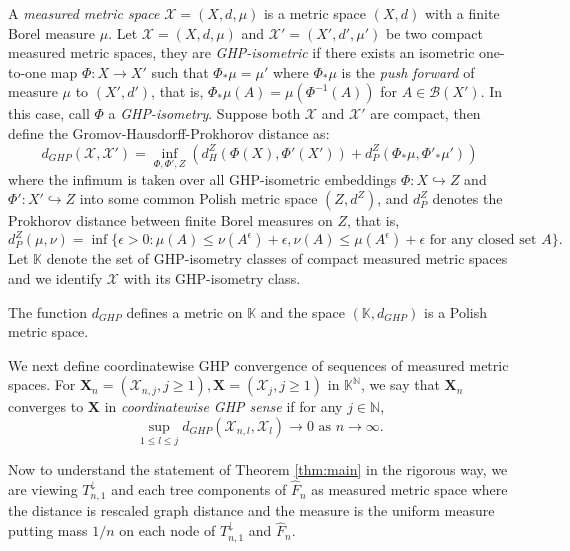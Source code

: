 A {\em measured metric space} $\mathcal{X}=(X, d, \mu)$ is a metric space $(X, d)$ with a finite Borel measure $\mu$. Let $\mathcal{X}=(X, d, \mu)$ and 
${\mathcal{X}}'=(X', d',\mu')$ be two compact measured metric spaces, they are {\em GHP-isometric} if there exists an isometric one-to-one map $\Phi: X\rightarrow X'$ such that $\Phi_{\ast}\mu=\mu'$ where $\Phi_{\ast}\mu$ is the {\em push forward} of measure $\mu$ to $(X', d')$, that is, $\Phi_{\ast}\mu(A)=\mu(\Phi^{-1}(A))$ for $A\in\mathcal{B}(X')$. In this case, call $\Phi$ a {\em GHP-isometry}. Suppose both $\mathcal{X}$ and $\mathcal{X'}$ are compact, then define the Gromov-Hausdorff-Prokhorov distance as:
$$d_{GHP}(\mathcal{X},\mathcal{X'})=\inf\limits_{\Phi, \Phi', Z}(d_H^Z(\Phi(X), \Phi'(X'))+d_P^Z(\Phi_\ast\mu, \Phi'_\ast\mu'))$$ where the infimum is taken over all GHP-isometric embeddings $\Phi: X\hookrightarrow Z$ and $\Phi': X'\hookrightarrow Z$ into some common Polish metric space $(Z, d^Z)$, and $d_P^Z$ denotes the Prokhorov distance between finite Borel measures on $Z$, that is, \[d_P^Z(\mu, \nu)=\inf\{\epsilon>0: \mu(A)\le\nu(A^\epsilon)+\epsilon, \nu(A)\le \mu(A^\epsilon)+\epsilon \mbox{ for any closed set }A\}.\]
Let $\mathbb{K}$ denote the set of GHP-isometry classes of compact measured metric spaces and we identify $\mathcal{X}$ with its GHP-isometry class. 
\begin{thm}
The function $d_{GHP}$ defines a metric on $\mathbb{K}$ and the space $(\mathbb{K}, d_{GHP})$ is a Polish metric space.
\end{thm}
We next define coordinatewise GHP convergence of sequences of measured metric spaces. For $\mathbf{X}_n=(\mathcal{X}_{n,j}, j\ge 1), \mathbf{X}=(\mathcal{X}_j, j\ge 1)$ in $\mathbb{K}^{\mathbb{N}}$, we say that $\mathbf{X}_n$ converges to $\mathbf{X}$ in {\em coordinatewise GHP sense} if for any $j\in\mathbb{N}$, \[\sup\limits_{1\le l\le j} d_{GHP}(\mathcal{X}_{n,l}, \mathcal{X}_l)\to 0 \mbox{ as } n\to\infty.\]

Now to understand the statement of Theorem \ref{thm:main} in the rigorous way, we are viewing $T^\downarrow_{n,1}$ and each tree components of $\hat{F}_n$ as measured metric space where the distance is rescaled graph distance and the measure is the uniform measure putting mass $1/n$ on each node of $T^\downarrow_{n,1}$ and $\hat{F}_n$.

